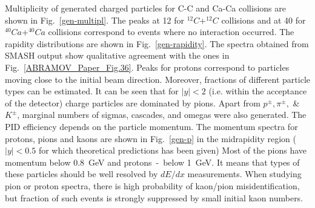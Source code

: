 \documentclass[12pt]{article}
\begin{document}
Multiplicity of generated charged particles for C-C and Ca-Ca collisions are shown in
Fig.~\ref{gen-multipl}. The peaks at 12 for $^{12}C$+$^{12}C$ collisions and
at 40 for $^{40}Ca$+$^{40}Ca$ collisions correspond to events where no interaction occurred. The rapidity distributions are shown in Fig.~\ref{gen-rapidity}. The
spectra obtained from SMASH output show qualitative agreement with the ones
in Fig.~\ref{ABRAMOV_Paper_Fig.36}. Peaks for protons correspond to particles
moving close to the initial beam direction. Moreover, fractions of different particle
types can be estimated. It can be seen that for $|y|<2$ (i.e. within the acceptance
of the detector) charge particles are dominated by pions.  Apart from $p^{\pm},
\pi^{\pm},$ \& $K^{\pm}$, marginal numbers of sigmas, cascades, and omegas
were also generated. The PID efficiency depends on the particle momentum. The momentum
spectra for protons, pions and kaons are shown in Fig.~\ref{gen-p} in the
midrapidity region ($|y|<0.5$ for which theoretical predictions has been given)  Most of
the pions have momentum below 0.8~GeV and protons~-~below 1~GeV. It means that
types of these particles should be well resolved by $dE/dx$ measurements.
When studying pion or proton spectra, there is high probability of kaon/pion
misidentification, but fraction of such events is strongly suppressed by small
initial kaon numbers.
\end{document}
